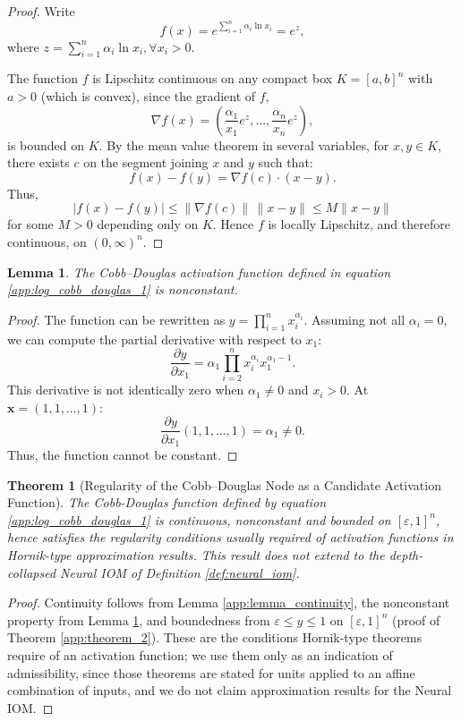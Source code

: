\documentclass[preprint,12pt,authoryear]{sn-jnl}
\newtheorem{lemma}{Lemma}
\newtheorem{theorem}{Theorem}
\begin{document}
\begin{proof}
Write
\[
f(x) = e^{\sum_{i=1}^n \alpha_i \ln x_i} = e^{z},
\]
where $z = \sum_{i=1}^n \alpha_i \ln x_i, \forall x_i > 0$.  

The function $f$ is Lipschitz continuous on any compact box $K=[a,b]^n$ with $a>0$ (which is convex), since the gradient of $f$,
\[
\nabla f(x) = \left(\frac{\alpha_1}{x_1} e^z, \dots, \frac{\alpha_n}{x_n} e^z\right),
\]
is bounded on $K$. By the mean value theorem in several variables, for $x,y \in K$, there exists $c$ on the segment joining $x$ and $y$ such that:
\[
f(x)-f(y) = \nabla f(c) \cdot (x-y).
\]
Thus,
\[
|f(x)-f(y)| \leq \|\nabla f(c)\| \, \|x-y\| \leq M \|x-y\|
\]
for some $M>0$ depending only on $K$. Hence $f$ is locally Lipschitz, and therefore continuous, on $(0,\infty)^n$.
\end{proof}

\begin{lemma} \label{app:lemma_nonconstant}
The Cobb--Douglas activation function defined in equation \ref{app:log_cobb_douglas_1} is nonconstant.
\end{lemma}

\begin{proof}
The function can be rewritten as $y = \prod_{i=1}^n x_i^{\alpha_i}$.
Assuming not all $\alpha_i = 0$, we can compute the partial derivative with respect to $x_1$:
\[
\frac{\partial y}{\partial x_1} = \alpha_1 \prod_{i=2}^n x_i^{\alpha_i} x_1^{\alpha_1-1}.
\]
This derivative is not identically zero when $\alpha_1 \neq 0$ and $x_i > 0$. 
At $\mathbf{x} = (1, 1, \ldots, 1)$:
\[
\frac{\partial y}{\partial x_1}(1,1,\ldots,1) = \alpha_1 \neq 0.
\]
Thus, the function cannot be constant.
\end{proof}

\setcounter{theorem}{0}
\begin{theorem}[Regularity of the Cobb--Douglas Node as a Candidate Activation Function]  \label{app:theorem_1}
The Cobb-Douglas function defined by equation \ref{app:log_cobb_douglas_1} is continuous, nonconstant and bounded on $[\varepsilon,1]^n$, hence satisfies the regularity conditions usually required of activation functions in Hornik-type approximation results. This result does not extend to the depth-collapsed Neural IOM of Definition \ref{def:neural_iom}.
\end{theorem}

\begin{proof}
Continuity follows from Lemma \ref{app:lemma_continuity}, the nonconstant property from Lemma \ref{app:lemma_nonconstant}, and boundedness from $\varepsilon \leq y \leq 1$ on $[\varepsilon,1]^n$ (proof of Theorem \ref{app:theorem_2}). These are the conditions Hornik-type theorems require of an activation function; we use them only as an indication of admissibility, since those theorems are stated for units applied to an affine combination of inputs, and we do not claim approximation results for the Neural IOM.
\end{proof}
\end{document}

